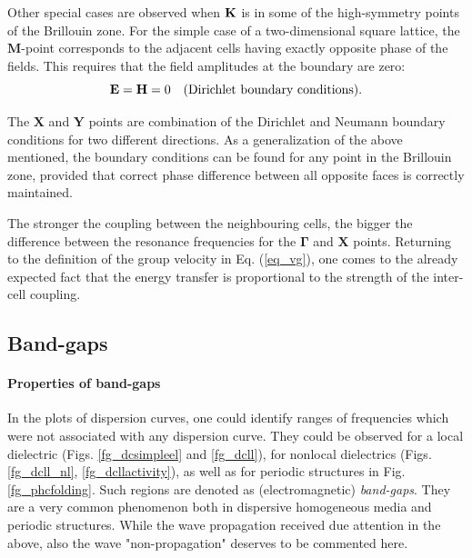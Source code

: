 Other special cases are observed when ${\mathbf{K}}$ is in some of the high-symmetry points of the Brillouin zone. For the simple case of a two-dimensional square lattice, the $\mathbf{M}$-point corresponds to the adjacent cells having exactly opposite phase of the fields. This requires that the field amplitudes at the boundary are zero:
\begin{equation} \mathbf{E} = \mathbf{H} = 0 \quad\text{(Dirichlet boundary conditions).} \label{eq_bcond_dirichlet}\end{equation} 

The $\mathbf{X}$ and $\mathbf{Y}$ points are combination of the Dirichlet and Neumann boundary conditions for two different directions.
As a generalization of the above mentioned, the boundary conditions can be found for any point in the Brillouin zone, provided that correct phase difference between all opposite faces is correctly maintained.

The stronger the coupling between the neighbouring cells, the bigger the difference between the resonance frequencies for the $\mathbf{\Gamma}$ and $\mathbf{X}$ points. Returning to the definition of the group velocity in Eq. (\ref{eq_vg}), one comes to the already expected fact that the energy transfer is proportional to the strength of the inter-cell coupling.


\subsection{Band-gaps} 
\paragraph{Properties of band-gaps} %
In the plots of dispersion curves, one could identify ranges of frequencies which were not associated with any dispersion curve. 
They could be observed for a local dielectric (Figs. \ref{fg_dcsimpleel} and \ref{fg_dcll}), for nonlocal dielectrics (Figs. \ref{fg_dcll_nl}, \ref{fg_dcllactivity}), as well as for periodic structures in Fig. \ref{fg_phcfolding}. Such regions are denoted as (electromagnetic) \textit{band-gaps}. They are a very common phenomenon both in dispersive homogeneous media and periodic structures. 
While the wave propagation received due attention in the above, also the wave "non-propagation" deserves to be commented here.

